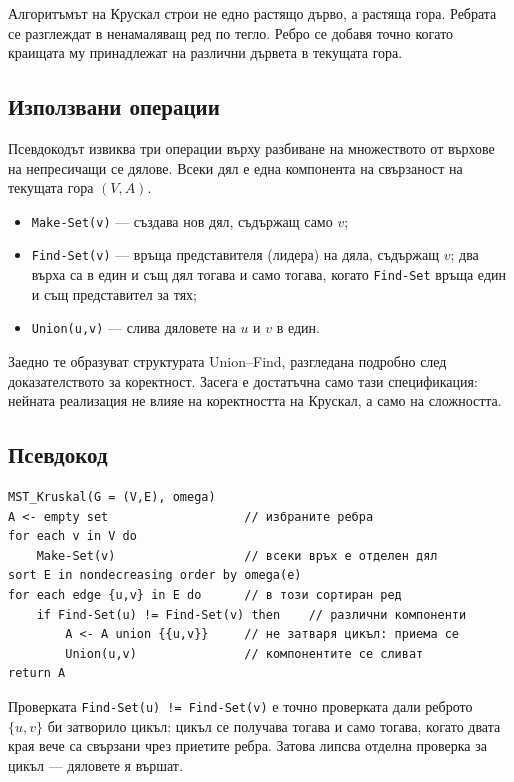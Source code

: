Алгоритъмът на Крускал строи не едно растящо дърво, а растяща гора. Ребрата се разглеждат в ненамаляващ ред по тегло. Ребро се добавя точно когато краищата му принадлежат на различни дървета в текущата гора.

\subsection{Използвани операции}\label{s:7.4.1}

Псевдокодът извиква три операции върху разбиване на множеството от върхове на непресичащи се дялове. Всеки дял е една компонента на свързаност на текущата гора $(V,A)$.

\begin{itemize}
\item \verb|Make-Set(v)| --- създава нов дял, съдържащ само $v$;
\item \verb|Find-Set(v)| --- връща представителя (лидера) на дяла, съдържащ $v$; два върха са в един и същ дял тогава и само тогава, когато \verb|Find-Set| връща един и същ представител за тях;
\item \verb|Union(u,v)| --- слива дяловете на $u$ и $v$ в един.
\end{itemize}

Заедно те образуват структурата Union--Find, разгледана подробно след доказателството за коректност. Засега е достатъчна само тази спецификация: нейната реализация не влияе на коректността на Крускал, а само на сложността.

\subsection{Псевдокод}\label{s:7.4.2}

\begin{verbatim}
MST_Kruskal(G = (V,E), omega)
A <- empty set                   // избраните ребра
for each v in V do
    Make-Set(v)                  // всеки връх е отделен дял
sort E in nondecreasing order by omega(e)
for each edge {u,v} in E do      // в този сортиран ред
    if Find-Set(u) != Find-Set(v) then    // различни компоненти
        A <- A union {{u,v}}     // не затваря цикъл: приема се
        Union(u,v)               // компонентите се сливат
return A
\end{verbatim}

Проверката \verb|Find-Set(u) != Find-Set(v)| е точно проверката дали реброто $\{u,v\}$ би затворило цикъл: цикъл се получава тогава и само тогава, когато двата края вече са свързани чрез приетите ребра. Затова липсва отделна проверка за цикъл --- дяловете я вършат.

